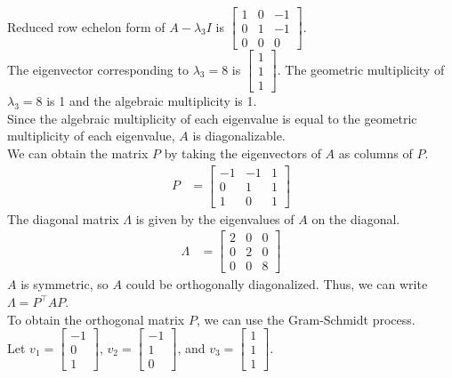 Reduced row echelon form of $A - \lambda_3 I$ is $\begin{bmatrix} 1 & 0 & -1 \\ 0 & 1 & -1 \\ 0 & 0 & 0 \end{bmatrix}$.\\
The eigenvector corresponding to $\lambda_3 = 8$ is $\begin{bmatrix} 1 \\ 1 \\ 1 \end{bmatrix}$. The geometric multiplicity of $\lambda_3 = 8$ is 1 and the algebraic multiplicity is 1.\\
Since the algebraic multiplicity of each eigenvalue is equal to the geometric multiplicity of each eigenvalue, $A$ is diagonalizable.\\
We can obtain the matrix $P$ by taking the eigenvectors of $A$ as columns of $P$.
\begin{align*}
    P &= \begin{bmatrix} -1 & -1 & 1 \\ 0 & 1 & 1 \\ 1 & 0 & 1 \end{bmatrix}
\end{align*}
The diagonal matrix $\Lambda$ is given by the eigenvalues of $A$ on the diagonal.
\begin{align*}
    \Lambda &= \begin{bmatrix} 2 & 0 & 0 \\ 0 & 2 & 0 \\ 0 & 0 & 8 \end{bmatrix}
\end{align*}
$A$ is symmetric, so $A$ could be orthogonally diagonalized. Thus, we can write $\Lambda = P^{\top}AP$. \\
To obtain the orthogonal matrix $P$, we can use the Gram-Schmidt process.\\
Let $v_1 = \begin{bmatrix} -1 \\ 0 \\ 1 \end{bmatrix}$, $v_2 = \begin{bmatrix} -1 \\ 1 \\ 0 \end{bmatrix}$, and $v_3 = \begin{bmatrix} 1 \\ 1 \\ 1 \end{bmatrix}$.\\
